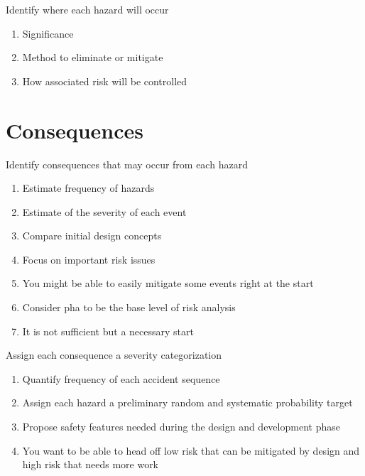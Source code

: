 \documentclass[aspectratio=1610,pdftex,dvipsnames,compress,xcolor={dvipsnames}]{beamer}
\newcommand{\acs}{\acrshort} %
\begin{document}
\begin{frame}{Identify where each hazard will occur}
    \begin{enumerate}[series=outerlist,topsep=0pt,itemsep=21pt,leftmargin=*,label=(\arabic*)]
        \item[]Significance
        \item[]Method to eliminate or mitigate
        \item[]How associated risk will be controlled
    \end{enumerate}
\end{frame}


\section{Consequences}


\addtocounter{framenumber}{-1}
\begin{frame}{Identify consequences that may occur from each hazard}
    \begin{enumerate}[series=outerlist,topsep=0pt,itemsep=9pt,leftmargin=*,label=(\arabic*)]
        \item[]Estimate frequency of hazards  
        \item[]Estimate of the severity of each event  
        \item[]Compare initial design concepts  
        \item[]Focus on important risk issues  
        \item[]You might be able to easily mitigate some events right at the start
        \item[]Consider \acs{pha} to be the base level of risk analysis  
        \item[]It is not sufficient but a necessary start
    \end{enumerate}
\end{frame}


\begin{frame}{Assign each consequence a severity categorization}
    \begin{enumerate}[series=outerlist,topsep=0pt,itemsep=21pt,leftmargin=*,label=(\arabic*)]
        \item[]Quantify frequency of each accident sequence
        \item[]Assign each hazard a preliminary random and systematic probability target
        \item[]Propose safety features needed during the design and development phase
        \item[]You want to be able to head off low risk that can be mitigated by design and high risk that needs more work 
    \end{enumerate}
\end{frame}
\end{document}
